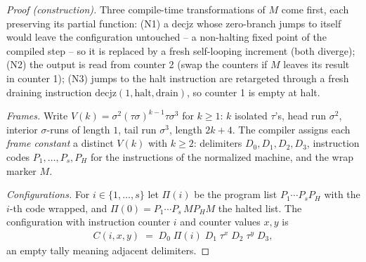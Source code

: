 \documentclass[runningheads,envcountsect]{llncs}
\begin{document}
\begin{proof}[Proof (construction)]
    Three compile-time transformations of $M$ come first, each
    preserving its partial function: (N1) a $\mathrm{decjz}$ whose
    zero-branch jumps to itself would leave the configuration
    untouched -- a non-halting fixed point of the compiled step -- so it
    is replaced by a fresh self-looping increment (both diverge);
    (N2) the output is read from counter 2 (swap the counters if $M$
    leaves its result in counter 1); (N3) jumps to the halt
    instruction are retargeted through a fresh draining instruction
    $\mathrm{decjz}(1, \mathrm{halt}, \mathrm{drain})$, so counter 1 is
    empty at halt.

    \emph{Frames.} Write
    $V(k) = \sigma^2(\tau\sigma)^{k-1}\tau\sigma^3$ for $k \geq 1$:
    $k$ isolated $\tau$'s, head run $\sigma^2$, interior $\sigma$-runs
    of length $1$, tail run $\sigma^3$, length $2k+4$. The compiler
    assigns each \emph{frame constant} a distinct $V(k)$ with $k \geq 2$:
    delimiters $D_0, D_1, D_2, D_3$, instruction codes
    $P_1, \dots, P_s, P_H$ for the instructions of the normalized
    machine, and the wrap marker $M$.

    \emph{Configurations.} For $i \in \{1, \dots, s\}$ let $\Pi(i)$ be
    the program list $P_1 \cdots P_s P_H$ with the $i$-th code wrapped,
    and $\Pi(0) = P_1 \cdots P_s\, M P_H M$ the halted list. The
    configuration with instruction counter $i$ and counter values $x, y$
    is
    \begin{align}
        C(i, x, y) \;=\; D_0\;\Pi(i)\;D_1\;\tau^{x}\;D_2\;\tau^{y}\;D_3 ,
    \end{align}
    an empty tally meaning adjacent delimiters.


\end{proof}
\end{document}
